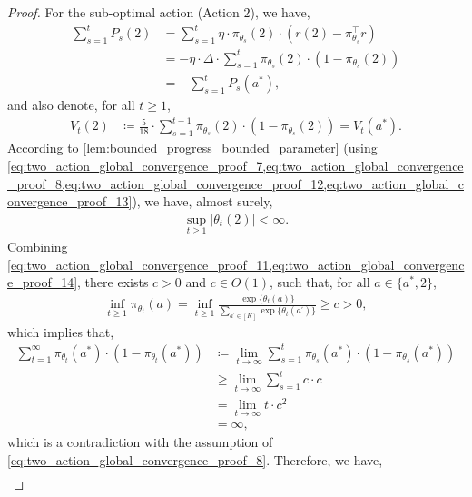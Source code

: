 \begin{proof}
For the sub-optimal action (Action $2$), we have,
\begin{align}
\label{eq:two_action_global_convergence_proof_12}
    \sum_{s=1}^t P_s(2) &=  \sum_{s=1}^t \eta \cdot \pi_{\theta_s}(2) \cdot ( r(2) - \pi_{\theta_s}^\top r ) \\
    &= - \eta \cdot \Delta \cdot  \sum_{s=1}^t  \pi_{\theta_s}(2) \cdot ( 1 - \pi_{\theta_s}(2)  ) \\
    &= - \sum_{s=1}^t P_s(a^*),
\end{align}
and also denote, for all $t \ge 1$,
\begin{align}
\label{eq:two_action_global_convergence_proof_13}
    V_t(2) &\coloneqq \frac{5}{18} \cdot \sum_{s=1}^{t-1}  \pi_{\theta_s}(2) \cdot (1-\pi_{\theta_s}(2)) = V_t(a^*).
\end{align}
According to \cref{lem:bounded_progress_bounded_parameter} (using \cref{eq:two_action_global_convergence_proof_7,eq:two_action_global_convergence_proof_8,eq:two_action_global_convergence_proof_12,eq:two_action_global_convergence_proof_13}), we have, almost surely,
\begin{align}
\label{eq:two_action_global_convergence_proof_14}
    \sup_{t \ge 1}{ \big| \theta_t(2) \big| } < \infty.
\end{align}
Combining \cref{eq:two_action_global_convergence_proof_11,eq:two_action_global_convergence_proof_14}, there exists $c > 0$ and $c \in O(1)$, such that, for all $a \in \{ a^*, 2 \}$,
\begin{align}
\label{eq:two_action_global_convergence_proof_15}
    \inf_{t \ge 1}{ \pi_{\theta_t}(a) } = \inf_{t \ge 1}{ \frac{ \exp\{ \theta_t(a) \} }{ \sum_{a^\prime \in [K]}{ \exp\{ \theta_t(a^\prime) } \} } } \ge c > 0,
\end{align}
which implies that,
\begin{align}
\label{eq:two_action_global_convergence_proof_16}
    \sum_{t=1}^{\infty}{\pi_{\theta_t}(a^*) \cdot ( 1 - \pi_{\theta_t}(a^*)  )} &\coloneqq \lim_{t \to \infty}{ \sum_{s=1}^{t}{ \pi_{\theta_s}(a^*) \cdot ( 1 - \pi_{\theta_s}(a^*)  ) } } \\
    &\ge \lim_{t \to \infty}{ \sum_{s=1}^{t}{ c \cdot c} } \\
    &= \lim_{t \to \infty}{ t \cdot c^2 } \\
    &= \infty,
\end{align}
which is a contradiction with the assumption of 
\cref{eq:two_action_global_convergence_proof_8}. Therefore, we have,
\begin{align}
\label{eq:two_action_global_convergence_proof_17}

\end{align}
\end{proof}
